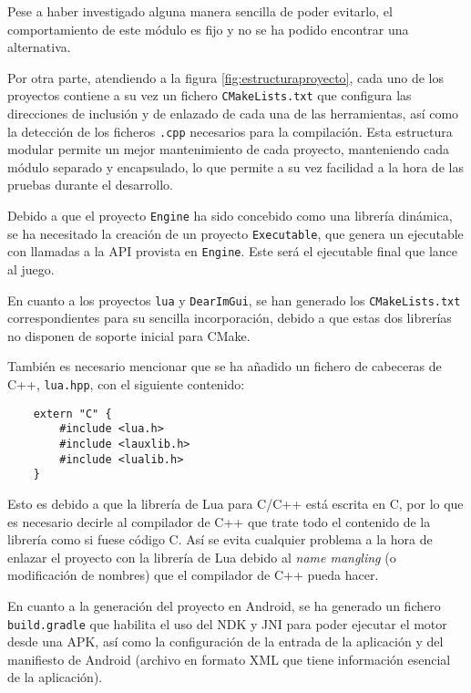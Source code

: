 Pese a haber investigado alguna manera sencilla de poder evitarlo, el comportamiento de este módulo es fijo y no se ha podido encontrar una alternativa.

\medskip

Por otra parte, atendiendo a la figura \ref{fig:estructuraproyecto}, cada uno de los proyectos contiene a su vez un fichero \texttt{CMakeLists.txt} que configura las direcciones de inclusión y de enlazado de cada una de las herramientas, así como la detección de los ficheros \texttt{.cpp} necesarios para la compilación. Esta estructura modular permite un mejor mantenimiento de cada proyecto, manteniendo cada módulo separado y encapsulado, lo que permite a su vez facilidad a la hora de las pruebas durante el desarrollo.

\medskip

Debido a que el proyecto \texttt{Engine} ha sido concebido como una librería dinámica, se ha necesitado la creación de un proyecto \texttt{Executable}, que genera un ejecutable con llamadas a la API provista en \texttt{Engine}. Este será el ejecutable final que lance al juego.

\medskip

En cuanto a los proyectos \texttt{lua} y \texttt{DearImGui}, se han generado los \texttt{CMakeLists.txt} correspondientes para su sencilla incorporación, debido a que estas dos librerías no disponen de soporte inicial para CMake.

\smallskip

También es necesario mencionar que se ha añadido un fichero de cabeceras de C++, \texttt{lua.hpp}, con el siguiente contenido:

\begin{verbatim}
	extern "C" {
		#include <lua.h>
		#include <lauxlib.h>
		#include <lualib.h>	
	}
\end{verbatim}

Esto es debido a que la librería de Lua para C/C++ está escrita en C, por lo que es necesario decirle al compilador de C++ que trate todo el contenido de la librería como si fuese código C. Así se evita cualquier problema a la hora de enlazar el proyecto con la librería de Lua debido al \textit{name mangling} (o modificación de nombres) que el compilador de C++ pueda hacer.

\bigskip

En cuanto a la generación del proyecto en Android, se ha generado un fichero \texttt{build.gradle} que habilita el uso del NDK y JNI para poder ejecutar el motor desde una APK, así como la configuración de la entrada de la aplicación y del manifiesto de Android (archivo en formato XML que tiene información esencial de la aplicación).

